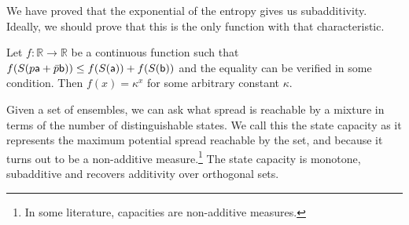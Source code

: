 \begin{mathSection}
\begin{remark}
	We have proved that the exponential of the entropy gives us subadditivity. Ideally, we should prove that this is the only function with that characteristic.
\end{remark}

\begin{conj}
	Let $f : \mathbb{R} \to \mathbb{R}$ be a continuous function such that $f(S(p\ens[a]+\bar{p}\ens[b])) \leq f(S(\ens[a])) + f(S(\ens[b]))$ and the equality can be verified in some condition. Then $f(x) = \kappa^x$ for some arbitrary constant $\kappa$.
\end{conj}
\end{mathSection}

Given a set of ensembles, we can ask what spread is reachable by a mixture in terms of the number of distinguishable states. We call this the state capacity as it represents the maximum potential spread reachable by the set, and because it turns out to be a non-additive measure.\footnote{In some literature, capacities are non-additive measures.} The state capacity is monotone, subadditive and recovers additivity over orthogonal sets.

